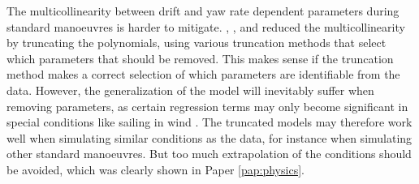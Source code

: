 The multicollinearity between drift and yaw rate dependent parameters during standard manoeuvres is harder to mitigate. \textcite{abkowitzMEASUREMENTHYDRODYNAMICCHARACTERISTICS1980},  \textcite{xuUncertaintyAnalysisHydrodynamic2019}, and \textcite{liuPhysicsinformedIdentificationMarine2024} reduced the multicollinearity by  truncating the polynomials, using various truncation methods that select which parameters that should be removed. This makes sense if the truncation method makes a correct selection of which parameters are identifiable from the data. However, the generalization of the model will inevitably suffer when removing parameters, as certain regression terms may only become significant in special conditions like sailing in wind \cite{abkowitzMEASUREMENTHYDRODYNAMICCHARACTERISTICS1980}. The truncated models may therefore work well when simulating similar conditions as the data, for instance when simulating other standard manoeuvres. But too much extrapolation of the conditions should be avoided, which was clearly shown in Paper \ref{pap:physics}. 



